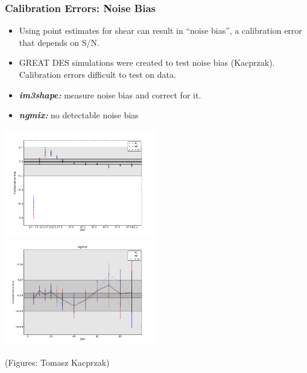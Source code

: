 \documentclass{beamer}
\begin{document}
\frame
{
    \frametitle{Calibration Errors: Noise Bias}

    \begin{itemize}

        \item Using point estimates for shear can result in ``noise bias'', a
            calibration error that depends on S/N.

        \item GREAT DES simulations were created to test noise bias (Kacprzak).
            Calibration errors difficult to test on data.

        \item {\bf {\em im3shape:}}  measure noise bias and correct for it.

        \item {\bf {\em ngmix:}} no detectable noise bias

    \end{itemize}

    \begin{center}
        \includegraphics[width=0.5\textwidth]{noise-bias-im3shape.png}
        \includegraphics[width=0.5\textwidth]{noise-bias-ngmix.png}
    \end{center}
    {\tiny (Figures: Tomasz Kacprzak)}
}
\end{document}
